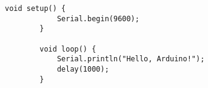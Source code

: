 \documentclass{article}
\begin{document}
	
	\begin{lstlisting}[caption=Arduino Test, label=lst:ArduinoTest]
		void setup() {
			Serial.begin(9600);
		}
		
		void loop() {
			Serial.println("Hello, Arduino!");
			delay(1000);
		}
	\end{lstlisting}
	
\end{document}
